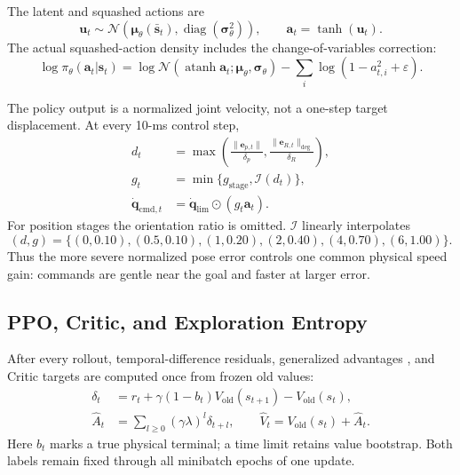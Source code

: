 \documentclass[conference]{IEEEtran}
\begin{document}
The latent and squashed actions are
\begin{equation}
\mathbf u_t\sim\mathcal N(\boldsymbol\mu_\theta(\bar{\mathbf s}_t),
\operatorname{diag}(\boldsymbol\sigma_\theta^2)),
\qquad
\mathbf a_t=\tanh(\mathbf u_t).
\label{eq:action}
\end{equation}
The actual squashed-action density includes the change-of-variables correction:
\begin{equation}
\log\pi_\theta(\mathbf a_t|\mathbf s_t)=
\log\mathcal N(\operatorname{atanh}\mathbf a_t;
\boldsymbol\mu_\theta,\boldsymbol\sigma_\theta)
-\sum_i\log(1-a_{t,i}^2+\varepsilon).
\label{eq:density}
\end{equation}

The policy output is a normalized joint velocity, not a one-step target displacement. At every 10-ms control step,
\begin{align}
d_t&=\max\!\left(
\frac{\|\mathbf e_{p,t}\|}{\delta_p},
\frac{\|\mathbf e_{R,t}\|_{\mathrm{deg}}}{\delta_R}\right),\nonumber\\
g_t&=\min\{g_{\mathrm{stage}},\mathcal I(d_t)\},\nonumber\\
\dot{\mathbf q}_{\mathrm{cmd},t}
&=\dot{\mathbf q}_{\mathrm{lim}}\odot(g_t\mathbf a_t).
\label{eq:gain}
\end{align}
For position stages the orientation ratio is omitted. $\mathcal I$ linearly interpolates
\[
(d,g)=\{(0,0.10),(0.5,0.10),(1,0.20),(2,0.40),(4,0.70),(6,1.00)\}.
\]
Thus the more severe normalized pose error controls one common physical speed gain: commands are gentle near the goal and faster at larger error.

\subsection{PPO, Critic, and Exploration Entropy}

After every rollout, temporal-difference residuals, generalized advantages \cite{schulman2015gae}, and Critic targets are computed once from frozen old values:
\begin{align}
\delta_t&=r_t+\gamma(1-b_t)V_{\mathrm{old}}(s_{t+1})
-V_{\mathrm{old}}(s_t),\nonumber\\
\hat A_t&=\sum_{l\geq0}(\gamma\lambda)^l\delta_{t+l},
\qquad
\hat V_t=V_{\mathrm{old}}(s_t)+\hat A_t .
\label{eq:gae}
\end{align}
Here $b_t$ marks a true physical terminal; a time limit retains value bootstrap. Both labels remain fixed through all minibatch epochs of one update.
\end{document}
